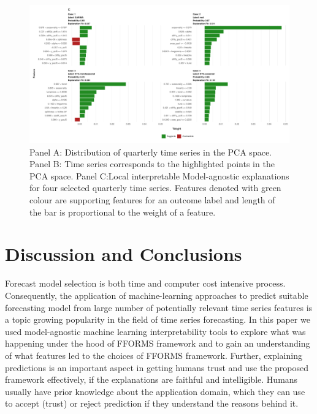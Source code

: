 \documentclass[11pt,a4paper,]{article}
\begin{document}
\begin{figure}[h]

{\centering \includegraphics{figures/quarterlylime2-1} 

}

\caption{Panel A: Distribution of quarterly time series in the PCA space. Panel B: Time series corresponds to the highlighted points in the PCA space. Panel C:Local interpretable Model-agnostic explanations for four selected quarterly time series. Features denoted with green colour are supporting features for an outcome label and length of the bar is proportional to the weight of a feature.}\label{fig:quarterlylime2}
\end{figure}

\section{Discussion and Conclusions}\label{conclusions}

Forecast model selection is both time and computer cost intensive
process. Consequently, the application of machine-learning approaches to
predict suitable forecasting model from large number of potentially
relevant time series features is a topic growing popularity in the field
of time series forecasting. In this paper we used model-agnostic machine
learning interpretability tools to explore what was happening under the
hood of FFORMS framework and to gain an understanding of what features
led to the choices of FFORMS framework. Further, explaining predictions
is an important aspect in getting humans trust and use the proposed
framework effectively, if the explanations are faithful and
intelligible. Humans usually have prior knowledge about the application
domain, which they can use to accept (trust) or reject prediction if
they understand the reasons behind it.
\end{document}
